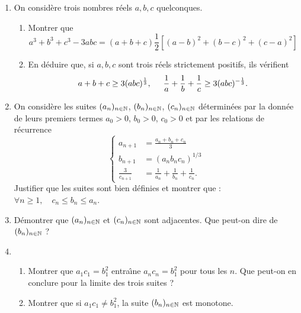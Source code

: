 \begin{enumerate}
\item  On consid{\`e}re trois nombres r{\'e}els $a,b,c$ quelconques.

\begin{enumerate}
\item  Montrer que
\[
a^{3}+b^{3}+c^{3}-3abc=(a+b+c)\frac{1}{2}\left[
(a-b)^{2}+(b-c)^{2}+(c-a)^{2}\right]
\]

\item  En d{\'e}duire que, si $a,b,c$ sont trois r{\'e}els strictement
positifs, ils v{\'e}rifient
\[
a+b+c \geq 3(abc)^{\frac{1}{3}}, \hspace{0.5cm}
\frac{1}{a} + \frac{1}{b} + \frac{1}{c} \geq  3(abc)^{-\frac{1}{3}}.
\]
\end{enumerate}

\item  On consid{\`e}re les suites $(a_{n})_{n\in \mathbb{N}}$,  $(b_{n})_{n\in \mathbb{N}}$, $(c_{n})_{n\in \mathbb{N}}$ d{\'e}termin{\'e}es par la donn{\'e}e de leurs premiers termes $a_{0}>0$, $b_{0}>0$, $c_{0}>0$ et par les relations de r{\'e}currence
\[
\left\lbrace 
\begin{aligned}
a_{n+1} &= \frac{a_{n}+b_{n}+c_{n}}{3} \\
b_{n+1} &= (a_{n}b_{n}c_{n})^{1/3} \\
\frac{3}{c_{n+1}} &= \frac{1}{a_{n}}+\frac{1}{b_{n}}+\frac{1}{c_{n}}.
\end{aligned}
\right. 
\]
Justifier que les suites sont bien d{\'e}finies et montrer que :
$ \forall n\geq 1,\quad c_{n}\leq b_{n} \leq a_{n}$.

\item  D{\'e}montrer que $(a_{n})_{n\in \mathbb{N}}$ et $(c_{n})_{n\in \mathbb{N}}$ sont adjacentes. Que peut-on dire de $(b_{n})_{n\in \mathbb{N}}$ ?

\item
\begin{enumerate}
\item  Montrer que $a_{1}c_{1}=b_{1}^{2}$ entra{\^\i}ne $a_{n}c_{n}=b_{1}^{2}$ pour tous les $n$. Que peut-on en conclure pour la limite des trois suites ?

\item  Montrer que si $a_{1}c_{1}\neq b_{1}^{2}$, la suite $(b_{n})_{n\in\mathbb{N}}$ est monotone.
\end{enumerate}
\end{enumerate}
